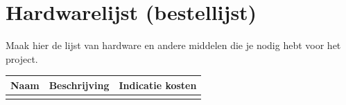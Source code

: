 \documentclass{article}
\begin{document}
\section{Hardwarelijst (bestellijst)}
Maak hier de lijst van hardware en andere middelen die je nodig hebt voor het project.  

\begin{table}[h]
  \begin{tabularx}{\textwidth}{| >{\raggedright\arraybackslash}X | >{\centering\arraybackslash}X | >{\centering\arraybackslash}X |}
  \hline
  Naam &  Beschrijving & Indicatie kosten  \\ \hline
   &  &  \\ \hline
  \end{tabularx}
\end{table}


\newpage


\end{document}

